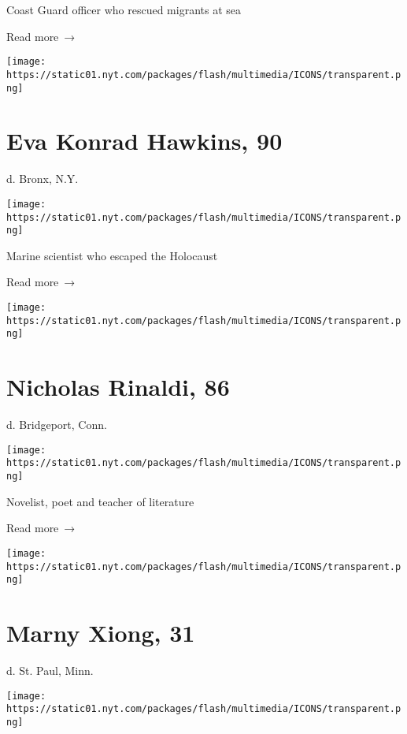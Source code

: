 Coast Guard officer who rescued migrants at sea

 Read more~→

\href{https://www.nytimes.com/2020/06/11/obituaries/eva-konrad-hawkins-dead-coronavirus.html}{}

\texttt{[image: https://static01.nyt.com/packages/flash/multimedia/ICONS/transparent.png]}

\hypertarget{eva-konrad-hawkins-90}{%
\section{Eva Konrad Hawkins, 90}\label{eva-konrad-hawkins-90}}

d. Bronx, N.Y.

\texttt{[image: https://static01.nyt.com/packages/flash/multimedia/ICONS/transparent.png]}

Marine scientist who escaped the Holocaust

 Read more~→

\href{https://www.nytimes.com/2020/06/11/books/nicholas-rinaldi-dead-coronavirus.html}{}

\texttt{[image: https://static01.nyt.com/packages/flash/multimedia/ICONS/transparent.png]}

\hypertarget{nicholas-rinaldi-86}{%
\section{Nicholas Rinaldi, 86}\label{nicholas-rinaldi-86}}

d. Bridgeport, Conn.

\texttt{[image: https://static01.nyt.com/packages/flash/multimedia/ICONS/transparent.png]}

Novelist, poet and teacher of literature

 Read more~→

\href{https://www.nytimes.com/2020/06/10/obituaries/marny-xiong-dead-coronavirus.html}{}

\texttt{[image: https://static01.nyt.com/packages/flash/multimedia/ICONS/transparent.png]}

\hypertarget{marny-xiong-31}{%
\section{Marny Xiong, 31}\label{marny-xiong-31}}

d. St. Paul, Minn.

\texttt{[image: https://static01.nyt.com/packages/flash/multimedia/ICONS/transparent.png]}

